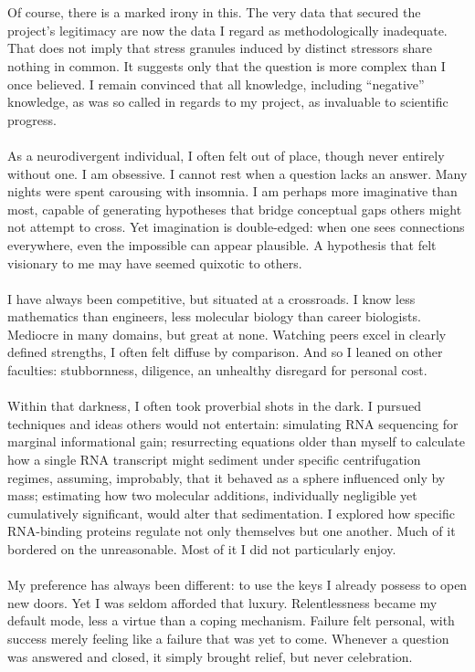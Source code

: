 \\
\\
Of course, there is a marked irony in this. The very data that secured the project’s legitimacy are now the data I regard as methodologically inadequate. That does not imply that stress granules induced by distinct stressors share nothing in common. It suggests only that the question is more complex than I once believed. I remain convinced that all knowledge, including “negative” knowledge, as was so called in regards to my project, as invaluable to scientific progress.
\\
\\
As a neurodivergent individual, I often felt out of place, though never entirely without one. I am obsessive. I cannot rest when a question lacks an answer. Many nights were spent carousing with insomnia. I am perhaps more imaginative than most, capable of generating hypotheses that bridge conceptual gaps others might not attempt to cross. Yet imagination is double-edged: when one sees connections everywhere, even the impossible can appear plausible. A hypothesis that felt visionary to me may have seemed quixotic to others.
\\
\\
I have always been competitive, but situated at a crossroads. I know less mathematics than engineers, less molecular biology than career biologists. Mediocre in many domains, but great at none. Watching peers excel in clearly defined strengths, I often felt diffuse by comparison. And so I leaned on other faculties: stubbornness, diligence, an unhealthy disregard for personal cost.
\\
\\
Within that darkness, I often took proverbial shots in the dark. I pursued techniques and ideas others would not entertain: simulating RNA sequencing for marginal informational gain; resurrecting equations older than myself to calculate how a single RNA transcript might sediment under specific centrifugation regimes, assuming, improbably, that it behaved as a sphere influenced only by mass; estimating how two molecular additions, individually negligible yet cumulatively significant, would alter that sedimentation. I explored how specific RNA-binding proteins regulate not only themselves but one another. Much of it bordered on the unreasonable. Most of it I did not particularly enjoy.
\\
\\
My preference has always been different: to use the keys I already possess to open new doors. Yet I was seldom afforded that luxury. Relentlessness became my default mode, less a virtue than a coping mechanism. Failure felt personal, with success merely feeling like a failure that was yet to come. Whenever a question was answered and closed, it simply brought relief, but never celebration.
